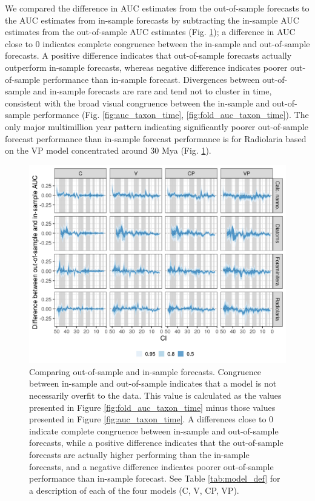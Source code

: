 \documentclass[12pt,letterpaper]{article}
\begin{document}
\begin{refsection}
We compared the difference in AUC estimates from the out-of-sample forecasts to the AUC estimates from in-sample forecasts by subtracting the in-sample AUC estimates from the out-of-sample AUC estimates (Fig. \ref{fig:oos_ins_diff}); a difference in AUC close to 0 indicates complete congruence between the in-sample and out-of-sample forecasts. A positive difference indicates that out-of-sample forecasts actually outperform in-sample forecasts, whereas negative difference indicates poorer out-of-sample performance than in-sample forecast. Divergences between out-of-sample and in-sample forecasts are rare and tend not to cluster in time, consistent with the broad visual congruence between the in-sample and out-of-sample performance (Fig. \ref{fig:auc_taxon_time}, \ref{fig:fold_auc_taxon_time}). The only major multimillion year pattern indicating significantly poorer out-of-sample forecast performance than in-sample forecast performance is for Radiolaria based on the VP model concentrated around 30 Mya (Fig. \ref{fig:oos_ins_diff}).

\begin{figure}[ht]
 \centering
 \includegraphics[width=\textwidth,height=0.5\textheight,keepaspectratio=true]{../results/figure/auc_diff}
 \caption{Comparing out-of-sample and in-sample forecasts. Congruence between in-sample and out-of-sample indicates that a model is not necessarily overfit to the data. This value is calculated as the values presented in Figure \ref{fig:fold_auc_taxon_time} minus those values presented in Figure \ref{fig:auc_taxon_time}. A differences close to 0 indicate complete congruence between in-sample and out-of-sample forecasts, while a positive difference indicates that the out-of-sample forecasts are actually higher performing than the in-sample forecasts, and a negative difference indicates poorer out-of-sample performance than in-sample forecast. See Table \ref{tab:model_def} for a description of each of the four models (C, V, CP, VP).}
 \label{fig:oos_ins_diff}
\end{figure}





\end{refsection}
\end{document}
